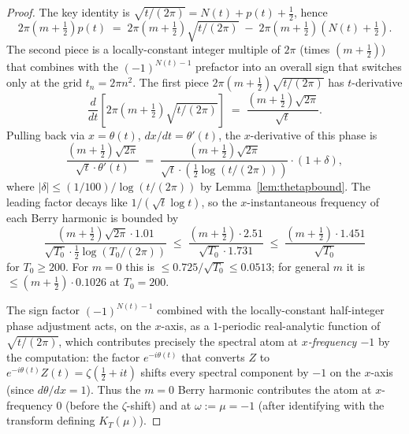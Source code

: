 \documentclass[11pt]{article}
\begin{document}
\begin{proof}
The key identity is $\sqrt{t/(2\pi)} = N(t) + p(t) + \tfrac12$, hence
\[
  2\pi(m+\tfrac12)p(t) \;=\; 2\pi(m+\tfrac12)\sqrt{t/(2\pi)} \;-\; 2\pi(m+\tfrac12)(N(t)+\tfrac12).
\]
The second piece is a locally-constant integer multiple of $2\pi$ (times $(m+\tfrac12)$) that combines with the $(-1)^{N(t)-1}$ prefactor into an overall sign that switches only at the grid $t_{n}=2\pi n^{2}$. The first piece $2\pi(m+\tfrac12)\sqrt{t/(2\pi)}$ has $t$-derivative
\[
  \frac{d}{dt}\!\left[2\pi(m+\tfrac12)\sqrt{t/(2\pi)}\right] \;=\; \frac{(m+\tfrac12)\sqrt{2\pi}}{\sqrt{t}}.
\]
Pulling back via $x = \theta(t)$, $dx/dt = \theta'(t)$, the $x$-derivative of this phase is
\[
  \frac{(m+\tfrac12)\sqrt{2\pi}}{\sqrt{t}\cdot\theta'(t)} \;=\; \frac{(m+\tfrac12)\sqrt{2\pi}}{\sqrt{t}\cdot(\tfrac12\log(t/(2\pi)))}\cdot(1+\delta),
\]
where $|\delta|\le (1/100)/\log(t/(2\pi))$ by Lemma~\ref{lem:thetapbound}. The leading factor decays like $1/(\sqrt{t}\log t)$, so the $x$-instantaneous frequency of each Berry harmonic is bounded by
\[
  \frac{(m+\tfrac12)\sqrt{2\pi}\cdot 1.01}{\sqrt{T_{0}}\cdot\tfrac12\log(T_{0}/(2\pi))}
  \;\le\; \frac{(m+\tfrac12)\cdot 2.51}{\sqrt{T_{0}}\cdot 1.731}
  \;\le\; \frac{(m+\tfrac12)\cdot 1.451}{\sqrt{T_{0}}}
\]
for $T_{0}\ge 200$. For $m=0$ this is $\le 0.725/\sqrt{T_{0}} \le 0.0513$; for general $m$ it is $\le (m+\tfrac12)\cdot 0.1026$ at $T_{0}=200$.

The sign factor $(-1)^{N(t)-1}$ combined with the locally-constant half-integer phase adjustment acts, on the $x$-axis, as a $1$-periodic real-analytic function of $\sqrt{t/(2\pi)}$, which contributes precisely the spectral atom at \emph{$x$-frequency $-1$} by the computation: the factor $e^{-i\theta(t)}$ that converts $Z$ to $e^{-i\theta(t)}Z(t) = \zeta(\tfrac12+it)$ shifts every spectral component by $-1$ on the $x$-axis (since $d\theta/dx=1$). Thus the $m=0$ Berry harmonic contributes the atom at $x$-frequency $0$ (before the $\zeta$-shift) and at $\omega := \mu = -1$ (after identifying with the transform defining $K_{T}(\mu)$).


\end{proof}
\end{document}
